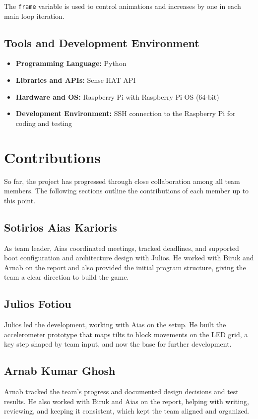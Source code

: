 \documentclass[11pt,titlepage,openright]{book}
\begin{document}
The \texttt{frame} variable is used to control animations and increases by one in each main loop iteration.

\section{Tools and Development Environment}
\begin{itemize}
    \item \textbf{Programming Language:} Python
    \item \textbf{Libraries and APIs:} Sense HAT API
    \item \textbf{Hardware and OS:} Raspberry Pi with Raspberry Pi OS (64-bit)
    \item \textbf{Development Environment:} SSH connection to the Raspberry Pi for coding and testing
\end{itemize}


\chapter{Contributions}
So far, the project has progressed through close collaboration among all team members. The following sections outline the contributions of each member up to this point.
\section{Sotirios Aias Karioris}
As team leader, Aias coordinated meetings, tracked deadlines, and supported boot configuration and architecture design with Julios. He worked with Biruk and Arnab on the report and also provided the initial program structure, giving the team a clear direction to build the game.

\section{Julios Fotiou}
Julios led the development, working with Aias on the setup. He built the accelerometer prototype that maps tilts to block movements on the LED grid, a key step shaped by team input, and now the base for further development.

\section{Arnab Kumar Ghosh}
Arnab tracked the team’s progress and documented design decisions and test results. He also worked with Biruk and Aias on the report, helping with writing, reviewing, and keeping it consistent, which kept the team aligned and organized. 
\end{document}
